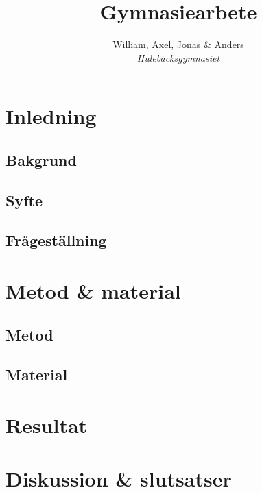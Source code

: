 \documentclass[]{article}
\title{Gymnasiearbete}
\author{William, Axel, Jonas \& Anders \\
\emph{Hulebäcksgymnasiet}}
\begin{document}
\maketitle
\section{Inledning}

\subsection{Bakgrund}

\subsection{Syfte}

\subsection{Frågeställning}

\section{Metod \& material}

\subsection{Metod}

\subsection{Material}

\section{Resultat}

\section{Diskussion \& slutsatser}
\end{document}

